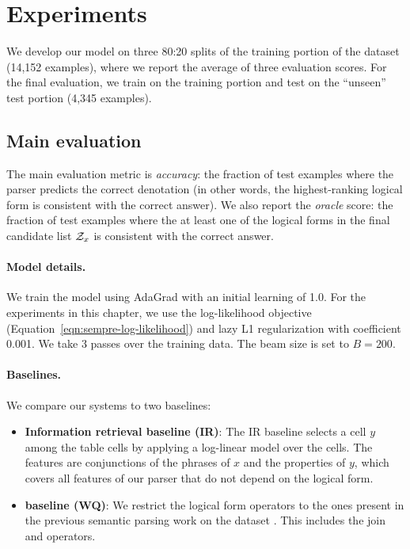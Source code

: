 \section{Experiments}
We develop our model on three 80:20 splits
of the training portion of the \wtq dataset (14,152 examples),
where we report the average of three evaluation scores.
For the final evaluation,
we train on the training portion and 
test on the ``unseen'' test portion
(4,345 examples).

\subsection{Main evaluation}
The main evaluation metric is \emph{accuracy}:
the fraction of test examples where
the parser predicts the correct denotation
(in other words, the highest-ranking logical form is consistent
with the correct answer).
We also report the \emph{oracle} score:
the fraction of test examples where
the at least one of the logical forms in the
final candidate list $\mathcal{Z}_x$ is consistent with the correct answer.

\paragraph{Model details.}
We train the model using AdaGrad \cite{duchi10adagrad}
with an initial learning of 1.0.
For the experiments in this chapter,
we use the log-likelihood objective
(Equation~\ref{eqn:sempre-log-likelihood})
and lazy L1 regularization
with coefficient 0.001.
We take 3 passes over the training data.
The beam size is set to $B = 200$.

\paragraph{Baselines.}
We compare our systems to two baselines:
\begin{itemize}

\item \textbf{Information retrieval baseline (IR)}:
The IR baseline selects a cell $y$
among the table cells by applying a log-linear model
over the cells.
The features are conjunctions of the phrases of $x$
and the properties of $y$,
which covers all features of our parser
that do not depend on the logical form.

\item \textbf{ baseline (WQ)}:
We restrict the logical form operators to the ones
present in the previous semantic parsing work
on the  dataset
\cite{berant2013freebase}.
This includes the join and  operators.
\end{itemize}


